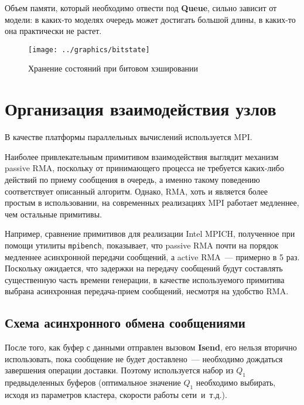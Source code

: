 \documentclass[12pt,a4paper,fleqn]{article}
\newcommand{\Code}[1]{\textbf{\mbox{#1}}}
\newcommand\etc{~и~т.д.}
\begin{document}
Объем памяти, который необходимо отвести под \Code{Queue}, сильно зависит от модели: в
каких-то моделях очередь может достигать большой длины, в каких-то она практически не
растет.

\begin{figure}[ht]
  \centering
  \texttt{[image: ../graphics/bitstate]}  
  \caption{Хранение состояний при битовом хэшировании}
  \label{fig:bitstate}
\end{figure}

\section{Организация взаимодействия узлов}

В качестве платформы параллельных вычислений используется MPI.

Наиболее привлекательным примитивом взаимодействия выглядит механизм passive RMA,
поскольку от принимающего процесса не требуется каких-либо действий по приему сообщения в
очередь, а именно такому поведению соответствует описанный алгоритм. Однако, RMA, хоть и
является более простым в использовании, на современных реализациях MPI работает медленнее,
чем остальные примитивы. 

Например, сравнение примитивов для реализации Intel MPICH, полученное при помощи утилиты
\texttt{mpibench}, показывает, что passive RMA почти на порядок медленнее асинхронной
передачи сообщений, а active RMA~--- примерно в 5 раз. Поскольку ожидается, что задержки
на передачу сообщений будут составлять существенную часть времени генерации, в качестве
используемого примитива выбрана асинхронная передача-прием сообщений, несмотря на удобство
RMA.

\subsection{Схема асинхронного обмена сообщениями}

После того, как буфер с данными отправлен вызовом \Code{Isend}, его нельзя вторично
использовать, пока сообщение не будет доставлено~--- необходимо дождаться завершения
операции доставки. Поэтому используется набор из $Q_1$ предвыделенных буферов (оптимальное
значение $Q_1$ необходимо выбирать, исходя из параметров кластера, скорости работы
сети\etc).
\end{document}
